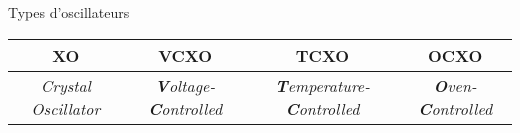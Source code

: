 \begin{frame}{Types d'oscillateurs}
    \begin{tabular}{c | c | c | c}
        \textbf{XO} & \textbf{VCXO} & \textbf{TCXO} & \textbf{OCXO}\\
        \hline
        \textit{Crystal Oscillator} & 
        \textit{\textbf{V}oltage-\textbf{C}ontrolled} &
        \textit{\textbf{T}emperature-\textbf{C}ontrolled} &
        \textit{\textbf{O}ven-\textbf{C}ontrolled}\\
    \end{tabular}
\end{frame}